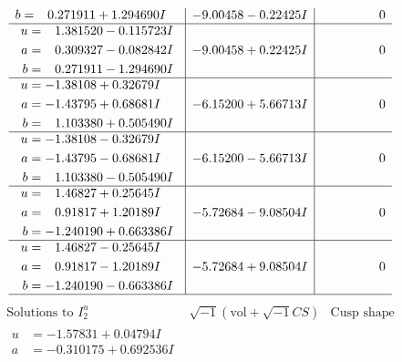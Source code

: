 \documentclass[1p]{elsarticle_modified}
\theoremstyle{definition}
\newcommand{\I}{\sqrt{-1}}
\begin{document}
$$\begin{array}{c|c|c}
\begin{aligned}
b &= \phantom{-}0.271911 + 1.294690 I\end{aligned}
 & -9.00458 - 0.22425 I & \phantom{-0.000000 } 0 \\ \hline\begin{aligned}
u &= \phantom{-}1.381520 - 0.115723 I \\
a &= \phantom{-}0.309327 - 0.082842 I \\
b &= \phantom{-}0.271911 - 1.294690 I\end{aligned}
 & -9.00458 + 0.22425 I & \phantom{-0.000000 } 0 \\ \hline\begin{aligned}
u &= -1.38108 + 0.32679 I \\
a &= -1.43795 + 0.68681 I \\
b &= \phantom{-}1.103380 + 0.505490 I\end{aligned}
 & -6.15200 + 5.66713 I & \phantom{-0.000000 } 0 \\ \hline\begin{aligned}
u &= -1.38108 - 0.32679 I \\
a &= -1.43795 - 0.68681 I \\
b &= \phantom{-}1.103380 - 0.505490 I\end{aligned}
 & -6.15200 - 5.66713 I & \phantom{-0.000000 } 0 \\ \hline\begin{aligned}
u &= \phantom{-}1.46827 + 0.25645 I \\
a &= \phantom{-}0.91817 + 1.20189 I \\
b &= -1.240190 + 0.663386 I\end{aligned}
 & -5.72684 - 9.08504 I & \phantom{-0.000000 } 0 \\ \hline\begin{aligned}
u &= \phantom{-}1.46827 - 0.25645 I \\
a &= \phantom{-}0.91817 - 1.20189 I \\
b &= -1.240190 - 0.663386 I\end{aligned}
 & -5.72684 + 9.08504 I & \phantom{-0.000000 } 0\\
 \hline 
 \end{array}$$\newpage$$\begin{array}{c|c|c}  
\text{Solutions to }I^u_{2}& \I (\text{vol} + \sqrt{-1}CS) & \text{Cusp shape}\\
 \hline 
\begin{aligned}
u &= -1.57831 + 0.04794 I \\
a &= -0.310175 + 0.692536 I \\

\end{aligned}
\end{array}$$
\end{document}
